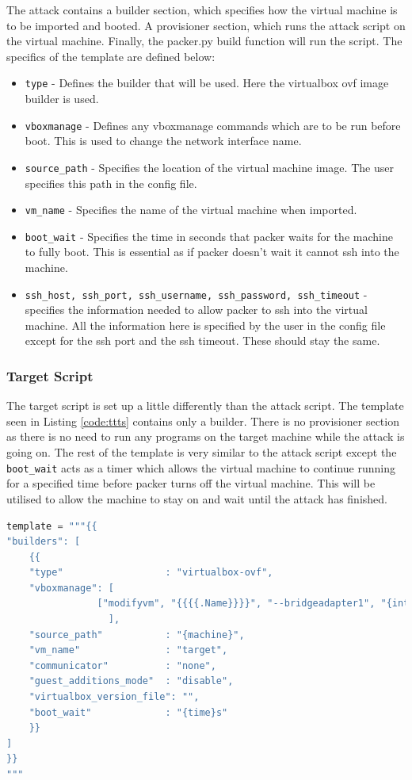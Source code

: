 The attack contains a builder section, which specifies how the virtual machine is to be imported and booted. A provisioner section, which runs the attack script on the virtual machine. Finally, the packer.py build function will run the script. The specifics of the template are defined below: 
\begin{itemize}
    \item \texttt{type} - Defines the builder that will be used. Here the virtualbox ovf image builder is used.
    \item \texttt{vboxmanage} - Defines any vboxmanage commands which are to be run before boot. This is used to change the network interface name.
    \item \texttt{source\_path} - Specifies the location of the virtual machine image. The user specifies this path in the config file.
    \item \texttt{vm\_name} - Specifies the name of the virtual machine when imported.
    \item \texttt{boot\_wait} - Specifies the time in seconds that packer waits for the machine to fully boot. This is essential as if packer doesn’t wait it cannot ssh into the machine.
    \item \texttt{ssh\_host, ssh\_port, ssh\_username, ssh\_password, ssh\_timeout} - specifies the information needed to allow packer to ssh into the virtual machine. All the information here is specified by the user in the config file except for the ssh port and the ssh timeout. These should stay the same.
\end{itemize}
\subsubsection{Target Script}
The target script is set up a little differently than the attack script. The template seen in Listing \ref{code:ttts} contains only a builder. There is no provisioner section as there is no need to run any programs on the target machine while the attack is going on. The rest of the template is very similar to the attack script except the \texttt{boot\_wait} acts as a timer which allows the virtual machine to continue running for a specified time before packer turns off the virtual machine. This will be utilised to allow the machine to stay on and wait until the attack has finished.
\begin{lstlisting}[language = python, caption = Target Script, label=code:ttts]
template = """{{
"builders": [
    {{
    "type"                  : "virtualbox-ovf",
    "vboxmanage": [
                ["modifyvm", "{{{{.Name}}}}", "--bridgeadapter1", "{interface}"]
                  ],
    "source_path"           : "{machine}",
    "vm_name"               : "target",
    "communicator"          : "none",
    "guest_additions_mode"  : "disable",
    "virtualbox_version_file": "",
    "boot_wait"             : "{time}s"
    }}
]
}}
"""
\end{lstlisting}

